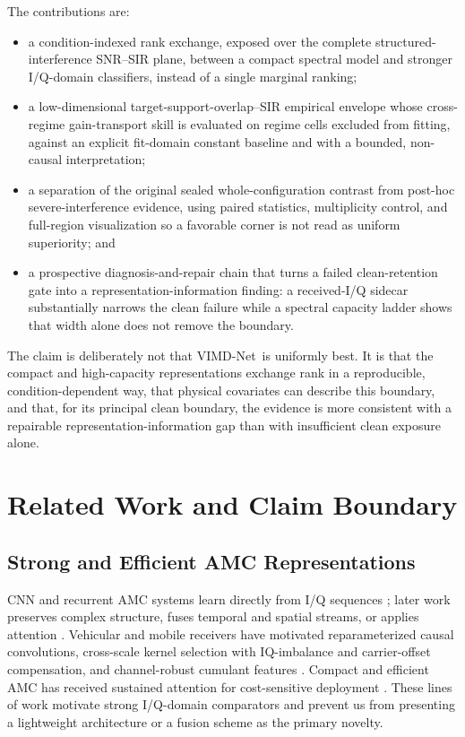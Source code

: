 \documentclass[letterpaper,journal]{IEEEtran}
\newcommand{\method}{VIMD-Net}
\begin{document}
The contributions are:
\begin{itemize}
  \item a condition-indexed rank exchange, exposed over the complete
  structured-interference SNR--SIR plane, between a compact spectral model and
  stronger I/Q-domain classifiers, instead of a single marginal ranking;
  \item a low-dimensional target-support-overlap--SIR empirical envelope whose cross-regime
  gain-transport skill is evaluated on regime cells excluded from fitting,
  against an explicit fit-domain constant baseline and with a bounded,
  non-causal interpretation;
  \item a separation of the original sealed whole-configuration contrast from
  post-hoc severe-interference evidence, using paired statistics, multiplicity
  control, and full-region visualization so a favorable corner is not read as
  uniform superiority; and
  \item a prospective diagnosis-and-repair chain that turns a failed
  clean-retention gate into a representation-information finding: a
  received-I/Q sidecar substantially narrows the clean failure while a
  spectral capacity ladder shows that width alone does not remove the
  boundary.
\end{itemize}

The claim is deliberately not that \method\ is uniformly best. It is that the
compact and high-capacity representations exchange rank in a reproducible,
condition-dependent way, that physical covariates can describe this boundary,
and that, for its principal clean boundary, the evidence is more consistent
with a repairable representation-information gap than with insufficient clean
exposure alone.

\section{Related Work and Claim Boundary}
\subsection{Strong and Efficient AMC Representations}
CNN and recurrent AMC systems learn directly from I/Q sequences
\cite{oshea2016cnn,meng2018amc,xu2020mcldnn}; later work preserves complex
structure, fuses temporal and spatial streams, or applies attention
\cite{tu2020complex,zhang2020dual,cai2022transformer,shao2025iqformer}.
Vehicular and mobile receivers have motivated reparameterized causal
convolutions, cross-scale kernel selection with IQ-imbalance and
carrier-offset compensation, and channel-robust cumulant
features \cite{tang2024repccnet,ren2024crosssknet,huang2024csqcc}. Compact and
efficient AMC has received sustained attention for cost-sensitive deployment
\cite{wang2020lightamc,efficientamc2026tgcn}. These lines of work
motivate strong I/Q-domain comparators and prevent us from presenting a
lightweight architecture or a fusion scheme as the primary novelty.
\end{document}
